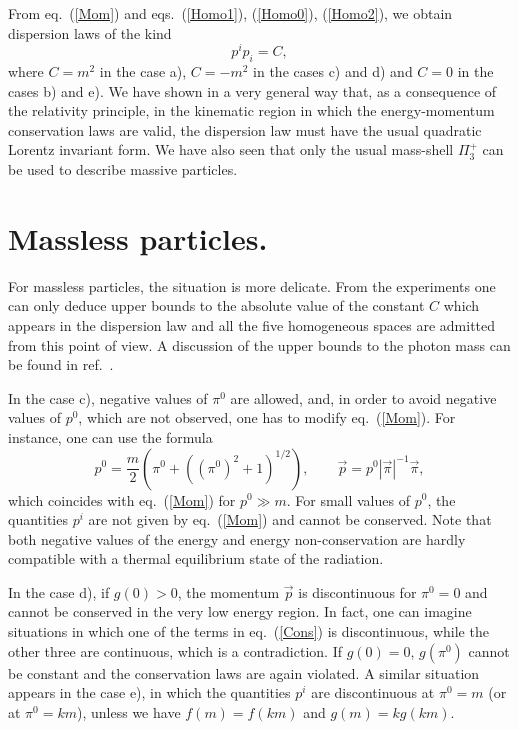 \documentclass[a4paper,12pt]{article}
\begin{document}
From eq.\ (\ref{Mom}) and eqs.\ (\ref{Homo1}), (\ref{Homo0}), (\ref{Homo2}), we obtain dispersion laws of the kind
\begin{equation} 
p^i p_i = C,
\end{equation} 
where $C = m^2$ in the case a), $C = -m^2$ in the cases c) and d) and $C = 0$ in the cases b) and e). We have shown in a very general way that, as a consequence of the relativity principle, in the kinematic region in which the energy-momentum conservation laws are valid, the dispersion law must have the usual quadratic Lorentz invariant form. We have also seen that only the usual mass-shell $\Pi_3^+$ can be used to describe massive particles.  

\section{Massless particles.}

For massless particles, the situation is more delicate. From the experiments one can only deduce upper bounds to the absolute value of the constant $C$ which appears in the dispersion law and all the five homogeneous spaces are admitted from this point of view. A discussion of the upper bounds to the photon mass can be found in ref.\ \cite{Jackson}. 

In the case c), negative values of $\pi^0$ are allowed, and, in order to avoid negative values of $p^0$, which are not observed, one has to modify eq.\ (\ref{Mom}). For instance, one can use the formula
\begin{equation} 
p^0 =  \frac m 2 \left(\pi^0 + ((\pi^0)^2 + 1)^{1/2}\right), \qquad
\vec p = p^0 |\vec\pi|^{-1} \vec\pi,
\end{equation} 
which coincides with  eq.\ (\ref{Mom}) for $p^0 \gg m$. For small values of $p^0$, the quantities $p^i$ are not given by eq.\  (\ref{Mom}) and cannot be conserved. Note that both negative values of the energy and energy non-conservation are hardly compatible with a thermal equilibrium state of the radiation.

In the case d), if $g(0) > 0$, the momentum $\vec p$ is discontinuous for $\pi^0 = 0$  and cannot be conserved in the very low energy region. In fact, one can imagine situations in which one of the terms in eq.\ (\ref{Cons}) is discontinuous, while the other three are continuous, which is a contradiction. If $g(0) = 0$, $g(\pi^0)$ cannot be constant and the conservation laws are again violated. A similar situation appears in the case e), in which  the quantities $p^i$ are discontinuous at $\pi^0 = m$ (or at $\pi^0 = k m$), unless we have $f(m) = f(km)$ and $g(m) = k g(km)$.
\end{document}
